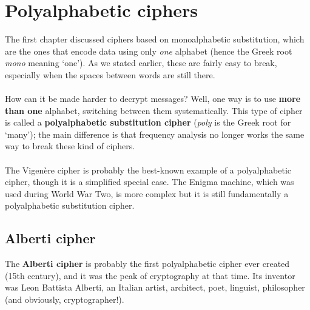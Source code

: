 \documentclass[Lau,binding=0.6cm,oneside]{sapthesis}
\begin{document}
\chapter{Polyalphabetic ciphers}
The first chapter discussed ciphers based on monoalphabetic substitution, which are the ones that encode data using only \textit{one} alphabet (hence the Greek root \textit{mono} meaning `one'). As we stated earlier, these are fairly easy to break, especially when the spaces between words are still there.\\\\
How can it be made harder to decrypt messages? Well, one way is to use \textbf{more than one} alphabet, switching between them systematically. This type of cipher is called a \textbf{polyalphabetic substitution cipher} (\textit{poly} is the Greek root for `many'); the main difference is that frequency analysis no longer works the same way to break these kind of ciphers.\\\\
The Vigenère cipher is probably the best-known example of a polyalphabetic cipher, though it is a simplified special case. The Enigma machine, which was used during World War Two, is more complex but it is still fundamentally a polyalphabetic substitution cipher.

\section{Alberti cipher}
The \textbf{Alberti cipher} is probably the first polyalphabetic cipher ever created (15th century), and it was the peak of cryptography at that time. Its inventor was Leon Battista Alberti, an Italian artist, architect, poet, linguist, philosopher (and obviously, cryptographer!).\\\\
\end{document}
